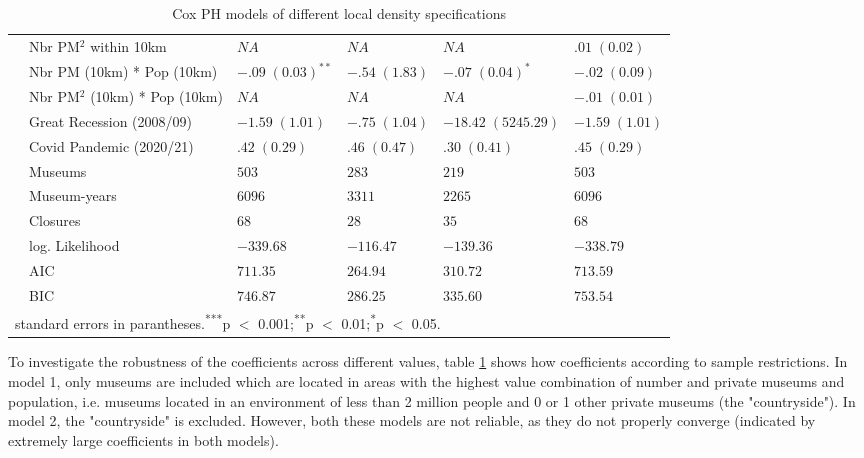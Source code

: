 \documentclass[12pt]{article}
\begin{document}
\begin{table}[ht]
\begin{tabular}{p{0mm}lllll}
   & Nbr PM$^{2}$ within 10km & $NA$ & $NA$ & $NA$ & $.01 \; (0.02)$ \\ 
   & Nbr PM (10km) * Pop (10km) & $-.09 \; (0.03)^{**}$ & $-.54 \; (1.83)$ & $-.07 \; (0.04)^{*}$ & $-.02 \; (0.09)$ \\ 
   & Nbr PM$^{2}$ (10km) * Pop (10km) & $NA$ & $NA$ & $NA$ & $-.01 \; (0.01)$ \\ 
   & Great Recession (2008/09) & $-1.59 \; (1.01)$ & $-.75 \; (1.04)$ & $-18.42 \; (5245.29)$ & $-1.59 \; (1.01)$ \\ 
   & Covid Pandemic (2020/21) & $.42 \; (0.29)$ & $.46 \; (0.47)$ & $.30 \; (0.41)$ & $.45 \; (0.29)$ \\ 
   \hline
 & Museums & $503$ & $283$ & $219$ & $503$ \\ 
   & Museum-years & $6096$ & $3311$ & $2265$ & $6096$ \\ 
   & Closures & $68$ & $28$ & $35$ & $68$ \\ 
   & log. Likelihood & $-339.68$ & $-116.47$ & $-139.36$ & $-338.79$ \\ 
   & AIC & $711.35$ & $264.94$ & $310.72$ & $713.59$ \\ 
   & BIC & $746.87$ & $286.25$ & $335.60$ & $753.54$ \\ 
   \hline 
 \multicolumn{6}{l}{\footnotesize{standard errors in parantheses.\textsuperscript{***}p $<$ 0.001;\textsuperscript{**}p $<$ 0.01;\textsuperscript{*}p $<$ 0.05.}}
\end{tabular}
\caption{Cox PH models of different local density specifications} 
\label{tbl:t_reg_coxph_density}
\end{table}

To investigate the robustness of the coefficients across different values, table \ref{tbl:t_reg_coxph_density} shows how coefficients according to sample restrictions. 
In model 1, only museums are included which are located in areas with the highest value combination of number and private museums and population, i.e. museums located in an environment of less than 2 million people and 0 or 1 other private museums (the "countryside").
In model 2, the "countryside" is excluded.
However, both these models are not reliable, as they do not properly converge (indicated by extremely large coefficients in both models).
\end{document}
